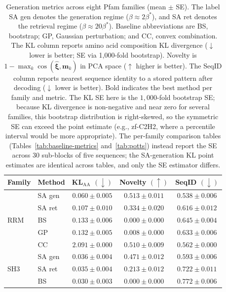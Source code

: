 \begin{table}[ht]
\centering
\caption{Generation metrics across eight Pfam families (mean $\pm$ SE). The label SA gen denotes the generation regime ($\beta \approx 2\beta^*$), and SA ret denotes the retrieval regime ($\beta \approx 20\beta^*$). Baseline abbreviations are BS, bootstrap; GP, Gaussian perturbation; and CC, convex combination. The KL column reports amino acid composition KL divergence ($\downarrow$ lower is better; SE via 1{,}000-fold bootstrap). Novelty is $1 - \max_k\cos(\hat{\boldsymbol{\xi}}, \mathbf{m}_k)$ in PCA space ($\uparrow$ higher is better). The SeqID column reports nearest sequence identity to a stored pattern after decoding ($\downarrow$ lower is better). Bold indicates the best method per family and metric. The KL SE here is the $1{,}000$-fold bootstrap SE; because KL divergence is non-negative and near zero for several families, this bootstrap distribution is right-skewed, so the symmetric SE can exceed the point estimate (e.g., zf-C2H2, where a percentile interval would be more appropriate). The per-family comparison tables (Tables~\ref{tab:baseline-metrics} and~\ref{tab:potts}) instead report the SE across $30$ sub-blocks of five sequences; the SA-generation KL point estimates are identical across tables, and only the SE estimator differs.}
\label{tab:results}
\small
\begin{tabular}{@{}llccc@{}}
\toprule
Family & Method & KL$_{\mathrm{AA}}$ $(\downarrow)$ & Novelty $(\uparrow)$ & SeqID $(\downarrow)$ \\
\midrule
\multirow{5}{*}{RRM}
 & SA gen  & $\mathbf{0.060 \pm 0.005}$ & $\mathbf{0.513 \pm 0.011}$ & $\mathbf{0.538 \pm 0.006}$ \\
 & SA ret  & $0.107 \pm 0.010$ & $0.334 \pm 0.020$ & $0.616 \pm 0.012$ \\
 & BS      & $0.133 \pm 0.006$ & $0.000 \pm 0.000$ & $0.645 \pm 0.004$ \\
 & GP      & $0.132 \pm 0.005$ & $0.008 \pm 0.000$ & $0.633 \pm 0.006$ \\
 & CC      & $2.091 \pm 0.000$ & $0.510 \pm 0.009$ & $0.562 \pm 0.000$ \\
\midrule
\multirow{5}{*}{SH3}
 & SA gen  & $0.036 \pm 0.004$ & $\mathbf{0.471 \pm 0.012}$ & $\mathbf{0.593 \pm 0.006}$ \\
 & SA ret  & $0.035 \pm 0.004$ & $0.213 \pm 0.012$ & $0.722 \pm 0.011$ \\
 & BS      & $\mathbf{0.030 \pm 0.003}$ & $0.000 \pm 0.000$ & $0.772 \pm 0.006$ \\

\end{tabular}
\end{table}
